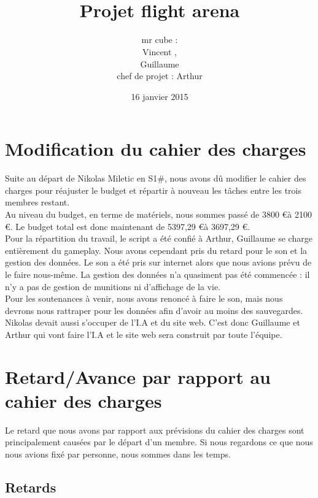\documentclass[10pt, titlepage]{report}
\title{\bsc{cahier des charges}\\Projet flight arena}
\author{mr cube :\\
Vincent \bsc{Rospini-Clerici},\\
Guillaume \bsc{Rebut}\\
chef de projet : Arthur \bsc{Remaud}}
\date{16 janvier 2015}
\begin{document}
\maketitle
\renewcommand{\contentsname}{Sommaire}
\renewcommand{\chaptername}{Partie}

\tableofcontents

\chapter{Modification du cahier des charges}
Suite au départ de Nikolas Miletic en S1\#, nous avons dû modifier le cahier des charges pour réajuster le budget et répartir à nouveau les tâches entre les trois membres restant.\\

Au niveau du budget, en terme de matériels, nous sommes passé de 3800 \euro à 2100 \euro. Le budget total est donc maintenant de 5397,29 \euro à 3697,29 \euro.\\

Pour la répartition du travail, le script a été confié à Arthur, Guillaume se charge entièrement du gameplay. Nous avons cependant pris du retard pour le son et la gestion des données. Le son a été pris sur internet alors que nous avions prévu de le faire nous-même. La gestion des données n'a quasiment pas été commencée : il n'y a pas de gestion de munitions ni d'affichage de la vie.\\

Pour les soutenances à venir, nous avons renoncé à faire le son, mais nous devrons nous rattraper pour les données afin d'avoir au moins des sauvegardes. Nikolas devait aussi s'occuper de l'I.A et du site web. C'est donc Guillaume et Arthur qui vont faire l'I.A et le site web sera construit par toute l'équipe.\\

\chapter{Retard/Avance par rapport au cahier des charges}
Le retard que nous avons par rapport aux prévisions du cahier des charges sont principalement causées par le départ d'un membre. Si nous regardons ce que nous nous avions fixé par personne, nous sommes dans les temps. 

\section{Retards}
\end{document}
